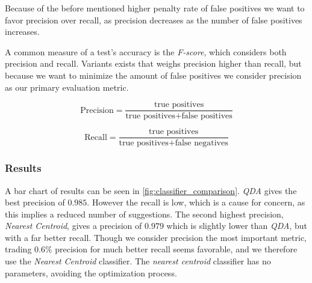 Because of the before mentioned higher penalty rate of false positives we want to favor precision over recall, as precision decreases as the number of false positives increases.

A common measure of a test's accuracy is the \emph{F-score}, which considers both precision and recall. Variants exists that weighs precision higher than recall, but because we want to minimize the amount of false positives we consider precision as our primary evaluation metric.

\begin{equation}\label{eq:precision}
\text{Precision} = \frac{\text{true positives}}{\text{true positives} + \text{false positives}}
\end{equation}

\begin{equation}\label{eq:recall}
\text{Recall} = \frac{\text{true positives}}{\text{true positives} + \text{false negatives}}
\end{equation}


\subsubsection{Results}
A bar chart of results can be seen in \cref{fig:classifier_comparison}. \emph{QDA} gives the best precision of $0.985$. However the recall is low, which is a cause for concern, as this implies a reduced number of suggestions. The second highest precision, \emph{Nearest Centroid}, gives a precision of $0.979$ which is slightly lower than \emph{QDA}, but with a far better recall. Though we consider precision the most important metric, trading $0.6\%$ precision for much better recall seems favorable, and we therefore use the \emph{Nearest Centroid} classifier. The \emph{nearest centroid} classifier has no parameters, avoiding the optimization process.


